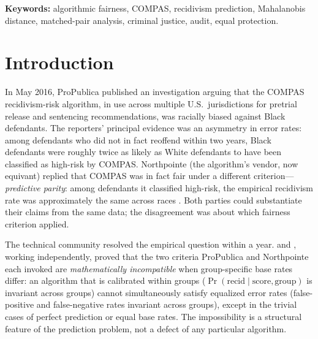 \documentclass[11pt]{article}
\begin{document}
\begin{abstract}
LBI is a matched-neighbourhood disparity diagnostic inspired by
individual-fairness principles and by the Aristotelian
``treat-like-cases-alike'' criterion. It is computationally cheap; it
requires only an audit dataset containing the algorithm's inputs, its
outputs, and the protected attribute (the algorithm itself need not
take the protected attribute as an input); it does not require
knowledge of the algorithm's internals; and it produces a
scale-indexed curve with confidence intervals. It is a
research-stage screening signal that may contribute one input to an
audit, not a validated regulatory audit standard. The reference
implementation is openly archived on
Zenodo (doi:10.5281/zenodo.21310251).
\end{abstract}

\medskip
\noindent\textbf{Keywords:} algorithmic fairness, COMPAS, recidivism
prediction, Mahalanobis distance, matched-pair analysis, criminal
justice, audit, equal protection.

\section{Introduction}
\label{sec:intro}

In May 2016, ProPublica published an investigation
\citep{angwin2016} arguing that the COMPAS recidivism-risk algorithm,
in use across multiple U.S.\ jurisdictions for pretrial release and
sentencing recommendations, was racially biased against Black
defendants. The reporters' principal evidence was an asymmetry in
error rates: among defendants who did not in fact reoffend within two
years, Black defendants were roughly twice as likely as White
defendants to have been classified as high-risk by COMPAS. Northpointe
(the algorithm's vendor, now equivant) replied that COMPAS was in fact
fair under a different criterion---\emph{predictive parity}: among
defendants it classified high-risk, the empirical recidivism rate was
approximately the same across races \citep{dieterich2016}. Both parties could substantiate their claims
from the same data; the disagreement was about which fairness criterion
applied.

The technical community resolved the empirical question within a year.
\citet{chouldechova2017} and
\citet{kleinberg2017}, working independently,
proved that the two criteria ProPublica and Northpointe each invoked
are \emph{mathematically incompatible} when group-specific base rates
differ: an algorithm that is calibrated within groups
($\Pr(\text{recid} \mid \text{score}, \text{group})$ is invariant
across groups) cannot simultaneously satisfy equalized error rates
(false-positive and false-negative rates invariant across groups),
except in the trivial cases of perfect prediction or equal base
rates. The impossibility is a structural feature of the prediction
problem, not a defect of any particular algorithm.
\end{document}
